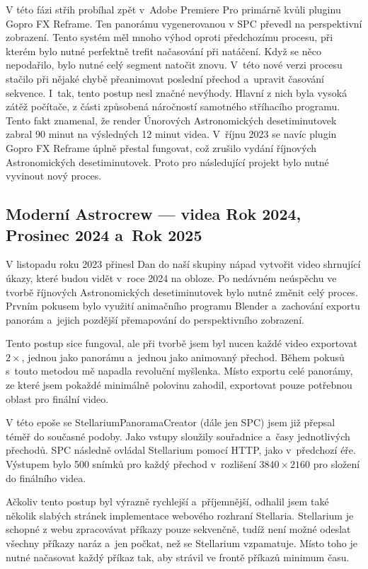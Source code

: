 \documentclass[12pt,a4paper,titlepage]{article}
\begin{document}
V této fázi střih probíhal zpět v~Adobe Premiere Pro primárně kvůli pluginu Gopro FX Reframe. Ten panorámu vygenerovanou v SPC převedl na perspektivní zobrazení. Tento systém měl mnoho výhod oproti předchozímu procesu, při kterém bylo nutné perfektně trefit načasování při natáčení. Když se něco nepodařilo, bylo nutné celý segment natočit znovu. V~této nové verzi procesu stačilo při nějaké chybě přeanimovat poslední přechod a~upravit časování sekvence. I~tak, tento postup nesl značné nevýhody. Hlavní z nich byla vysoká zátěž počítače, z části způsobená náročností samotného stříhacího programu. Tento fakt znamenal, že render Únorových Astronomických desetiminutovek zabral 90 minut na výsledných 12 minut videa. V~říjnu 2023 se navíc plugin Gopro FX Reframe úplně přestal fungovat, což zrušilo vydání říjnových Astronomických desetiminutovek. Proto pro následující projekt bylo nutné vyvinout nový proces. 
\subsection{Moderní Astrocrew --- videa Rok 2024, Prosinec 2024 a~Rok 2025}
V listopadu roku 2023 přinesl Dan do naší skupiny nápad vytvořit video shrnující úkazy, které budou vidět v~roce 2024 na obloze. Po nedávném neúspěchu ve tvorbě říjnových Astronomických desetiminutovek bylo nutné změnit celý proces. Prvním pokusem bylo využití animačního programu Blender a~zachování exportu panorám a~jejich pozdější přemapování do perspektivního zobrazení. 

Tento postup sice fungoval, ale při tvorbě jsem byl nucen každé video exportovat \(2\times \), jednou jako panorámu a~jednou jako animovaný přechod. Během pokusů s~touto metodou mě napadla revoluční myšlenka. Místo exportu celé panorámy, ze které jsem pokaždé minimálně polovinu zahodil, exportovat pouze potřebnou oblast pro finální video. 

V této epoše se StellariumPanoramaCreator (dále jen SPC) jsem již přepsal téměř do současné podoby. Jako vstupy sloužily souřadnice a~časy jednotlivých přechodů. SPC následně ovládal Stellarium pomocí HTTP, jako v~předchozí éře. Výstupem bylo 500 snímků pro každý přechod v~rozlišení \(3840\times2160\) pro složení do finálního videa. 

Ačkoliv tento postup byl výrazně rychlejší a~příjemnější, odhalil jsem také několik slabých stránek implementace webového rozhraní Stellaria. Stellarium je schopné z webu zpracovávat příkazy pouze sekvenčně, tudíž není možné odeslat všechny příkazy naráz a~jen počkat, než se Stellarium vzpamatuje. Místo toho je nutné načasovat každý příkaz tak, aby strávil ve frontě příkazů minimum času. 
\end{document}
